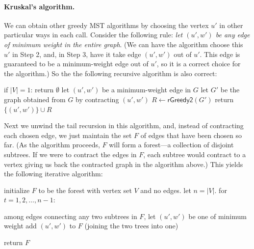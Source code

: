 
\paragraph{Kruskal's algorithm.}
We can obtain other greedy MST algorithms
by choosing the vertex $u'$ in other particular ways in each call.
Consider the following rule:
\emph{let $(u', w')$ be any edge of minimum weight in the entire graph}.
(We can have the algorithm choose this $u'$ in Step 2,
and, in Step 3, have it take edge $(u', w')$ out of $u'$.
This edge is guaranteed to be a minimum-weight edge out of $u'$,
so it is a correct choice for the algorithm.)
So the the following recursive algorithm is also correct:
\begin{myframed}
  \begin{steps}
  \item[{{\sf rGreedy2}$(G=(V,E))$:}]
    \step if $|V|=1$: return $\emptyset$
    \step let $(u', w')$ be a minimum-weight edge in $G$
    \step let $G'$ be the graph obtained from $G$ by contracting $(u', w')$
    \step $R \gets \textsf{rGreedy2}(G')$
    \step return $\{(u', w')\} \cup R$
  \end{steps}
\end{myframed}

Next we unwind the tail recursion in this algorithm,
and, instead of contracting each chosen edge, 
we just maintain the set $F$ of edges that have been chosen so far.
(As the algorithm proceeds,
$F$ will form a forest---a collection of disjoint subtrees.
If we were to contract the edges in $F$,
each subtree would contract to a vertex
giving us back the contracted graph in the algorithm above.)
This yields the following iterative algorithm:
\begin{myframed}
  \begin{steps}
  \item[{{\sf iGreedy2}$(G=(V,E))$:}]
    \step initialize  $F$ to be the forest with vertex set $V$ and no edges.  let $n=|V|$.
    \step for $t=1,2,\ldots,n-1$:
    \begin{block}
      \step among edges connecting any two subtrees in $F$, let $(u', w')$ be one of minimum weight 
      \step add $(u', w')$ to $F$ (joining the two trees into one)
    \end{block}
    \step return $F$
  \end{steps}
\end{myframed}

